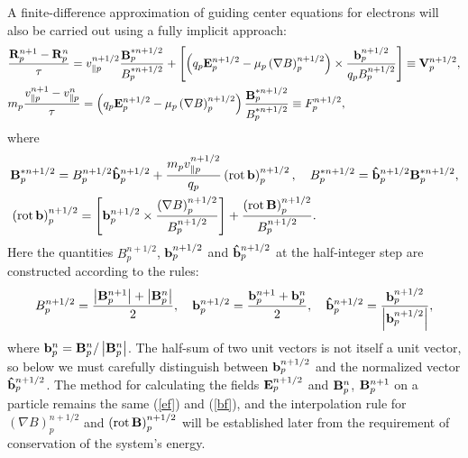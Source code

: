 \documentclass[final,3p]{elsarticle}
\newcommand{\rot}{\mbox{\rm{rot\,}}}
\begin{document}
A finite-difference approximation of guiding center equations for electrons will also be carried out using a fully implicit approach: 
\begin{align}
	&\frac{{\bf R}_p^{n+1}-{\bf R}_p^{n}}{\tau}=v_{\|p}^{n+1/2}\frac{{\bf B}_p^{\ast n+1/2}}{B_p^{\ast n+1/2}}+\left[\left(q_p{\bf E}_p^{n+1/2}-\mu_p\left(\nabla B\right)_p^{n+1/2}\right)\times \frac{{\bf b}_p^{n+1/2}}{q_p B_p^{n+1/2}}\right]\equiv {\bf V}_p^{n+1/2}, \label{drift_r}\\
	&m_p \frac{v_{\|p}^{n+1}-v_{\|p}^{n}}{\tau}= \left(q_p{\bf E}_p^{n+1/2}-\mu_p\left(\nabla B\right)_p^{n+1/2}\right) \frac{{\bf B}_p^{\ast n+1/2}}{B_p^{\ast n+1/2}}\equiv F_p^{n+1/2},        \label{vpar}
\end{align}
where
\begin{align}
	&{\bf B}_p^{\ast n+1/2}=B_p^{n+1/2}{\bf \hat{b}}_p^{n+1/2}+\frac{m_p v_{\|p}^{n+1/2}}{q_p} \left(\rot{\bf b}\right)_p^{n+1/2}, \quad B_p^{\ast n+1/2}={\bf \hat{b}}_p^{n+1/2}{\bf B}_p^{\ast n+1/2}, \label{bstar}\\
	&\left(\rot{\bf b}\right)_p^{n+1/2}=\left[{\bf b}_p^{n+1/2}\times \frac{\left(\nabla B\right)_p^{n+1/2}}{B_p^{n+1/2}}\right]+ \frac{\left(\rot {\bf B}\right)_p^{n+1/2}}{B_p^{n+1/2}}.
\end{align}
Here the quantities $B_p^{n+1/2}$, ${\bf b}_p^{n+1/2}$ and ${\bf \hat{b}}_p^{n+1/2}$ at the half-integer step are constructed according to the rules:
\begin{equation}\label{bhalf}
	B_p^{n+1/2}=\frac{\left|{\bf B}_p^{n+1}\right|+\left|{\bf B}_p^{n}\right|}{2}, \quad {\bf b}_p^{n+1/2}=\frac{{\bf b}_p^{n+1}+{\bf b}_p^{n}}{2}, \quad {\bf \hat{b}}_p^{n+1/2}=\frac{{\bf b}_p^{n+1/2}}{\left|{\bf b}_p^{n+1/2}\right|},
\end{equation}
where ${\bf b}_p^{n}={\bf B}_p^{n}/\left|{\bf B}_p^{n}\right|$. The half-sum of two unit vectors is not itself a unit vector, so below we must carefully distinguish between ${\bf b}_p^{n+1/2}$ and the normalized vector ${\bf \hat{b}}_p^{n+1/2}$. The method for calculating the fields ${\bf E}_p^{n+1/2}$ and ${\bf B}_p^{n}$, ${\bf B}_p^{n+1}$ on a particle remains the same (\ref{ef}) and (\ref{bf}), and the interpolation rule for $\left(\nabla B\right)_p^{n+1/2}$ and $\left(\rot {\bf B}\right)_p^{n+1/2}$ will be established later from the requirement of conservation of the system's energy.
\end{document}
